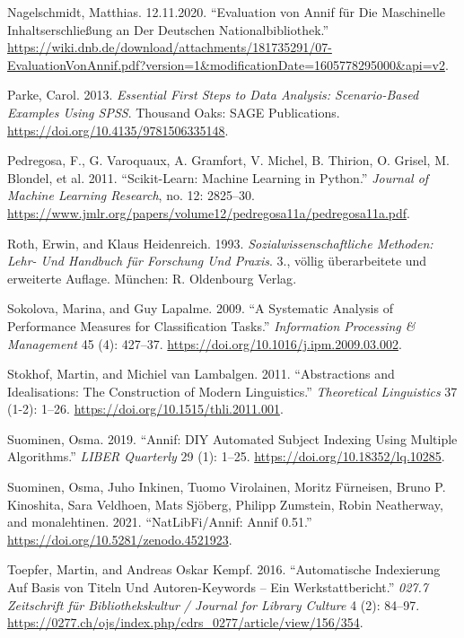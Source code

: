 \begin{CSLReferences}{1}{0}
\leavevmode\hypertarget{ref-Nagelschmidt.12.11.2020}{}%
Nagelschmidt, Matthias. 12.11.2020. {``Evaluation von Annif f{ü}r Die
Maschinelle Inhaltserschlie{ß}ung an Der Deutschen
Nationalbibliothek.''}
\url{https://wiki.dnb.de/download/attachments/181735291/07-EvaluationVonAnnif.pdf?version=1\&modificationDate=1605778295000\&api=v2}.

\leavevmode\hypertarget{ref-Parke.2013}{}%
Parke, Carol. 2013. \emph{Essential First Steps to Data Analysis:
Scenario-Based Examples Using SPSS}. Thousand Oaks: {SAGE Publications}.
\url{https://doi.org/10.4135/9781506335148}.

\leavevmode\hypertarget{ref-Pedregosa.2011}{}%
Pedregosa, F., G. Varoquaux, A. Gramfort, V. Michel, B. Thirion, O.
Grisel, M. Blondel, et al. 2011. {``Scikit-Learn: Machine Learning in
Python.''} \emph{Journal of Machine Learning Research}, no. 12:
2825--30.
\url{https://www.jmlr.org/papers/volume12/pedregosa11a/pedregosa11a.pdf}.

\leavevmode\hypertarget{ref-Roth.1993}{}%
Roth, Erwin, and Klaus Heidenreich. 1993. \emph{Sozialwissenschaftliche
Methoden: Lehr- Und Handbuch f{ü}r Forschung Und Praxis}. 3., v{ö}llig
{ü}berarbeitete und erweiterte Auflage. M{ü}nchen: {R. Oldenbourg
Verlag}.

\leavevmode\hypertarget{ref-Sokolova.2009}{}%
Sokolova, Marina, and Guy Lapalme. 2009. {``A Systematic Analysis of
Performance Measures for Classification Tasks.''} \emph{Information
Processing {\&} Management} 45 (4): 427--37.
\url{https://doi.org/10.1016/j.ipm.2009.03.002}.

\leavevmode\hypertarget{ref-Stokhof.2011}{}%
Stokhof, Martin, and Michiel van Lambalgen. 2011. {``Abstractions and
Idealisations: The Construction of Modern Linguistics.''}
\emph{Theoretical Linguistics} 37 (1-2): 1--26.
\url{https://doi.org/10.1515/thli.2011.001}.

\leavevmode\hypertarget{ref-Suominen.2019}{}%
Suominen, Osma. 2019. {``Annif: DIY Automated Subject Indexing Using
Multiple Algorithms.''} \emph{LIBER Quarterly} 29 (1): 1--25.
\url{https://doi.org/10.18352/lq.10285}.

\leavevmode\hypertarget{ref-Suominen.2021}{}%
Suominen, Osma, Juho Inkinen, Tuomo Virolainen, Moritz Fürneisen, Bruno
P. Kinoshita, Sara Veldhoen, Mats Sjöberg, Philipp Zumstein, Robin
Neatherway, and monalehtinen. 2021. {``NatLibFi/Annif: Annif 0.51.''}
\url{https://doi.org/10.5281/zenodo.4521923}.

\leavevmode\hypertarget{ref-Toepfer.2016}{}%
Toepfer, Martin, and Andreas Oskar Kempf. 2016. {``Automatische
Indexierung Auf Basis von Titeln Und Autoren-Keywords -- Ein
Werkstattbericht.''} \emph{027.7 Zeitschrift f{ü}r Bibliothekskultur /
Journal for Library Culture} 4 (2): 84--97.
\url{https://0277.ch/ojs/index.php/cdrs_0277/article/view/156/354}.


\end{CSLReferences}
